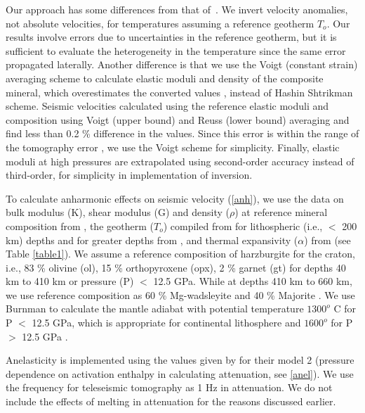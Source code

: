\documentclass[draft,linenumbers]{agujournal2018}
\begin{document}
Our approach has some differences from that of~\citet{Cammarano2003}. We invert velocity anomalies, not absolute velocities, for temperatures assuming a reference geotherm $T_o$. Our results involve errors due to uncertainties in the reference geotherm, but it is sufficient to evaluate the heterogeneity in the temperature since the same error propagated laterally. Another difference is that we use the Voigt (constant strain) averaging scheme to calculate elastic moduli and density of the composite mineral, which overestimates the converted values \citep{watt_1976}, instead of Hashin Shtrikman scheme. Seismic velocities calculated using the reference elastic moduli and composition using Voigt (upper bound) and Reuss (lower bound) averaging and find less than 0.2 \% difference in the values. Since this error is within the range of the tomography error \citep{Biryol_2016}, we use the Voigt scheme for simplicity. Finally, elastic moduli at high pressures are extrapolated using second-order accuracy instead of third-order, for simplicity in implementation of inversion.  

To calculate anharmonic effects on seismic velocity (\ref{anh}), we use the data on bulk modulus (K), shear modulus (G) and density ($\rho$) at reference mineral composition from \citet{Cammarano2003}, the geotherm ($T_o$) compiled from \citet{Goes_2002} for lithospheric (i.e., $<$ 200 km) depths and for greater depths from \citet{turcotte2014geodynamics}, and thermal expansivity ($\alpha$) from \citet{saxena_data} (see Table \ref{table1}). We assume a reference composition of harzburgite for the craton, i.e., 83 \% olivine (ol), 15 \% orthopyroxene (opx), 2 \% garnet (gt) \citep{mcdonough1998mineralogy} for depths 40 km to 410 km or pressure (P) $<$ 12.5 GPa. While at depths 410 km to 660 km, we use reference composition as 60 \% Mg-wadsleyite and 40 \% Majorite  \citep{haggerty1995upper}. We use Burnman \citep{cottaar2014burnman} to calculate the mantle adiabat with potential temperature $1300^o$ C for P $<$ 12.5 GPa, which is appropriate for continental lithosphere \citep{rudnick1998thermal} and $1600^o$ for P $>$ 12.5 GPa \citep{katsura2010adiabatic}. 

Anelasticity is implemented using the values given by \citet{sobolev1996upper} for their model 2 (pressure dependence on activation enthalpy in calculating attenuation, see \ref{anel}). We use the frequency for teleseismic tomography as 1 Hz in attenuation. We do not include the effects of melting in attenuation for the reasons discussed earlier.
\end{document}
